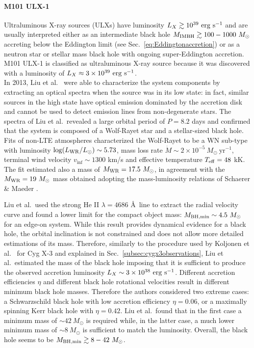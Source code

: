 \documentclass[a4paper,titlepage]{book}     	%
\newcommand{\sun}{\ensuremath{_\odot}}
\newcommand{\mdot}{\ensuremath{\dot{M}}}
\newcommand{\msun}{\ensuremath{M\sun}}
\newcommand{\lsun}{L_{\odot}}
\newcommand{\yr}{\text{yr}}
\newcommand{\mwr}{\ensuremath{M_\textup{WR}}}
\begin{document}
\paragraph{M101 ULX-1} Ultraluminous X-ray sources (ULXs) have luminosity $L_X \gtrsim 10^{39}~\rm erg~s^{-1}$ and are usually interpreted either as an intermediate black hole $M_{\rm IMBH} \gtrsim 100-1000~\msun$ accreting below the Eddington limit (see Sec.\ \ref{eq:Eddingtonaccretion}) or as a neutron star or  stellar mass black hole with ongoing super-Eddington accretion. M101 ULX-1 is classified as ultraluminous X-ray source because it was discovered with a luminosity of $L_X \approx 3 \times 10^{39}~\rm erg~s^{-1}$. \\

In 2013, Liu et al.\ \cite{M101ULX-1_Liu2013} were able to characterize the system components by extracting an optical spectra when the source was in its low state: in fact, similar sources in the high state have optical emission dominated by the accretion disk and cannot be used to detect emission lines from non-degenerate stars. The spectra of Liu et al.\ revealed a large orbital period of $P=8.2$ days and confirmed that the system is composed of a Wolf-Rayet star and a stellar-sized black hole. Fits of non-LTE atmospheres characterized the Wolf-Rayet to be a WN sub-type with luminosity $\log(L_{\rm WR}/\lsun) \sim 5.73$, mass loss rate $\mdot \sim 2 \times 10^{-5}~\msun~\yr^{-1}$, terminal wind velocity $v_{\inf} \sim 1300$ km/s and effective temperature $T_{\rm eff} = 48$ kK. The fit estimated also a mass of $\mwr = 17.5~\msun$, in agreement with the $\mwr = 19~\msun$ mass obtained adopting the mass-luminosity relations of Schaerer \& Maeder \cite{schaerer1992MLrelationWR}.

Liu et al.\ used the strong He II $\lambda=4686$ \AA ~line to extract the radial velocity curve and found a lower limit for the compact object mass: $M_{\rm BH, min} \sim 4.5~\msun$ for an edge-on system. While this result provides dynamical evidence for a black hole, the orbital inclination is not constrained and does not allow more detailed estimations of its mass. Therefore, similarly to the procedure used by Koljonen et al.\ \cite{CygX-3_Koljonen2017} for Cyg X-3 and explained in Sec.\ \ref{subsec:cygx3observations}, Liu et al.\ estimated the mass of the black hole imposing that it is sufficient to produce the observed accretion luminosity $L_X \sim 3 \times 10^{38}~\rm erg~s^{-1}$. Different accretion efficiencies $\eta$ and different black hole rotational velocities result in different minimum black hole masses. Therefore the authors considered two extreme cases: a Schwarzschild black hole with low accretion efficiency $\eta = 0.06$, or  a maximally spinning Kerr black hole with $\eta = 0.42$. Liu et al.\ found that in the first case a minimum mass of $\sim 42~\msun$ is required while, in the latter case, a much lower minimum mass of $\sim 8~\msun$ is sufficient to match the luminosity. Overall, the black hole seems to be $M_{\rm BH, min} \gtrsim 8-42~\msun$. 
\end{document}
